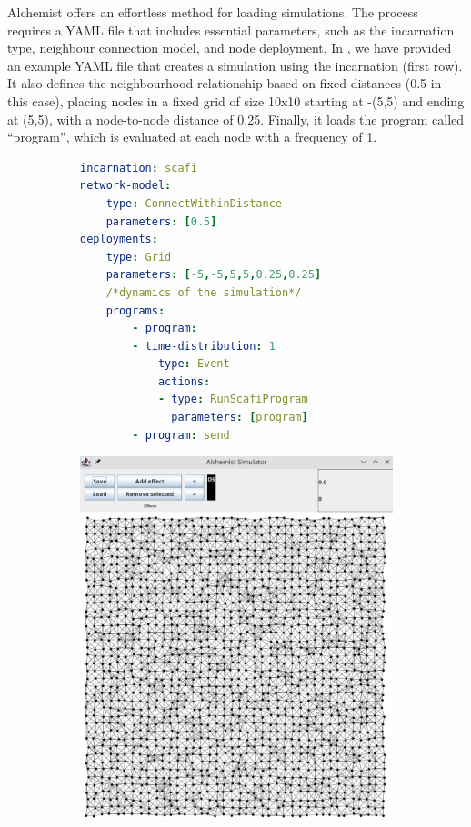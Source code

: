 Alchemist offers an effortless method for loading simulations. 
 The process requires a YAML file that includes essential parameters, 
 such as the incarnation type, neighbour connection model, and node deployment. 
 In , we have provided an example YAML file 
 that creates a simulation using the \scafi{} incarnation (first row). 
 It also defines the neighbourhood relationship based on fixed distances (0.5 in this case), 
 placing nodes in a fixed grid of size 10x10 starting at -(5,5) and ending at (5,5), 
 with a node-to-node distance of 0.25. 
 Finally, it loads the \scafi{} program called ``program'', 
 which is evaluated at each node with a frequency of 1. 
\begin{figure}
\centering
\begin{subfigure}[b]{0.49\textwidth}
    \centering
    \begin{lstlisting}[language=yaml, basicstyle=\small\ttfamily, caption={An Alchemist simulation example.}, captionpos=b, label=coordination2023:fig:alchemist-yaml]
incarnation: scafi
network-model:
    type: ConnectWithinDistance
    parameters: [0.5]
deployments:
    type: Grid
    parameters: [-5,-5,5,5,0.25,0.25]
    /*dynamics of the simulation*/
    programs: 
        - program:
        - time-distribution: 1
            type: Event
            actions: 
            - type: RunScafiProgram
              parameters: [program]
        - program: send
\end{lstlisting}
\end{subfigure}
\hfill
\begin{subfigure}[b]{0.49\textwidth}
    \centering
    \includegraphics[width=\textwidth]{papers/coordination2023/imgs/alchemist.png}

\end{subfigure}
\end{figure}
